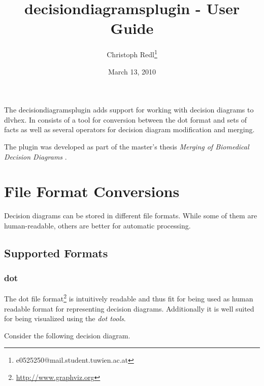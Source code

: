 \documentclass[a4paper,11pt]{article}
\theoremstyle{definition}
\newcommand{\dlvhex}{\textsf{dlvhex}\xspace }
\newcommand{\dotff}{\textsf{dot}\xspace }
\newcommand{\DrawDD}
	{
		\tikzset{edge from parent/.style=
		  {draw,
		  ->,
		   edge from parent path={(\tikzparentnode) -- (\tikzchildnode)}}} 
		\tikzset{every node/.style={draw, rectangle, rounded corners=1mm, minimum width=1cm}}
		\tikzset{every leaf node/.style={draw, rectangle, rounded corners=0mm}}
		\tikzset{level distance=1.2cm}
		\tikzset{el/.style={auto,draw=none}}	%
	}
\begin{document}
	\title{decisiondiagramsplugin - User Guide}
	\date{March 13, 2010}
	\author{Christoph Redl\footnote{e0525250@mail.student.tuwien.ac.at}}
	\maketitle

	The decisiondiagramsplugin adds support for working with decision diagrams to \dlvhex. In consists of a tool for conversion between the \dotff format and sets of facts as well as
	several operators for decision diagram modification and merging.
	
	The plugin was developed as part of the master's thesis \emph{Merging of Biomedical Decision Diagrams} \cite{CR10DD}.

	
	\section{File Format Conversions}
	\label{sec:Conversion}

		Decision diagrams can be stored in different file formats. While some of them are human-readable, others are better for automatic processing.
		
		\subsection{Supported Formats}

			\subsubsection{\dotff}

				The \dotff file format\footnote{\url{http://www.graphviz.org}} is intuitively readable and thus fit for being used as human readable format for representing decision diagrams.
				Additionally it is well suited for being visualized using the \emph{\dotff tools}.
			
				Consider the following decision diagram.
				
				\begin{minipage}[t]{1.00\textwidth}
					\label{fig:DecisionDiagram}
					\center
				\end{minipage}
				
\end{document}
